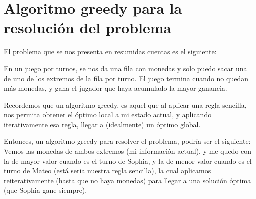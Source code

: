 \section{Algoritmo greedy para la resolución del problema}

El problema que se nos presenta en resumidas cuentas es el siguiente:

En un juego por turnos, se nos da una fila con monedas y solo puedo sacar una de uno de los extremos de la fila por turno. El juego termina cuando no quedan más monedas, y gana el jugador que haya acumulado la mayor ganancia.

Recordemos que un algoritmo greedy, es aquel que al aplicar una regla sencilla, nos permita obtener el óptimo local a mi estado actual, y aplicando iterativamente esa regla, llegar a (idealmente) un óptimo global.

Entonces, un algoritmo greedy para resolver el problema, podría ser el siguiente: Vemos las monedas de ambos extremos (mi información actual), y me quedo con la de mayor valor cuando es el turno de Sophia, y la de menor valor cuando es el turno de Mateo (está seria nuestra regla sencilla), la cual aplicamos reiterativamente (hasta que no haya monedas) para llegar a una solución óptima (que Sophia gane siempre).
